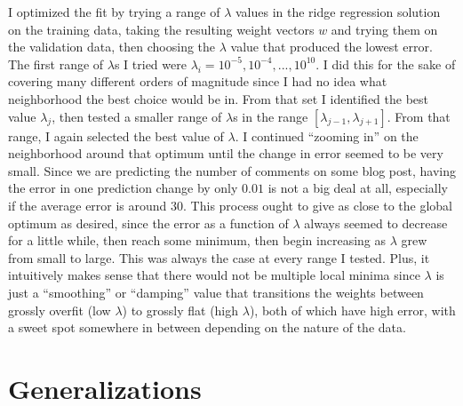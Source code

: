 \documentclass{paper}
\begin{document}
I optimized the fit by trying a range of $\lambda$ values in the ridge regression solution on the training data, taking the resulting weight vectors $w$ and trying them on the validation data, then choosing the $\lambda$ value that produced the lowest error. The first range of $\lambda$s I tried were $\lambda_i = 10^{-5}, 10^{-4}, ..., 10^10$. I did this for the sake of covering many different orders of magnitude since I had no idea what neighborhood the best choice would be in. From that set I identified the best value $\lambda_j$, then tested a smaller range of $\lambda$s in the range $[\lambda_{j-1}, \lambda_{j+1}]$. From that range, I again selected the best value of $\lambda$. I continued ``zooming in'' on the neighborhood around that optimum until the change in error seemed to be very small. Since we are predicting the number of comments on some blog post, having the error in one prediction change by only $0.01$ is not a big deal at all, especially if the average error is around $30$. This process ought to give as close to the global optimum as desired, since the error as a function of $\lambda$ always seemed to decrease for a little while, then reach some minimum, then begin increasing as $\lambda$ grew from small to large. This was always the case at every range I tested. Plus, it intuitively makes sense that there would not be multiple local minima since $\lambda$ is just a ``smoothing'' or ``damping'' value that transitions the weights between grossly overfit (low $\lambda$) to grossly flat (high $\lambda$), both of which have high error, with a sweet spot somewhere in between depending on the nature of the data.

\section{Generalizations}
\end{document}
